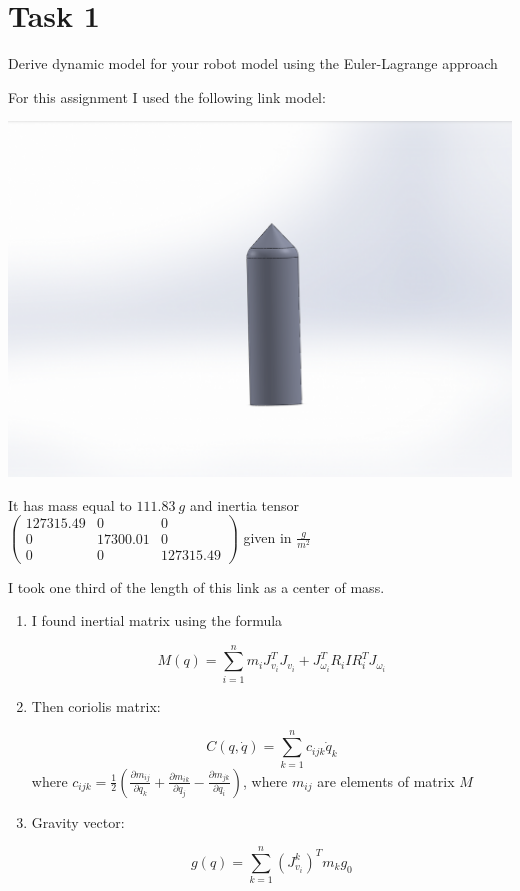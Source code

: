 \documentclass{article}
\begin{document}
    \section*{Task 1}

    Derive dynamic model for your robot model using the Euler-Lagrange approach

    For this assignment I used the following link model:

    \includegraphics[width=\linewidth]{part_image.png}

    It has mass equal to $111.83\ g$ and inertia tensor $\begin{pmatrix}
        127315.49 & 0 & 0 \\
        0 & 17300.01 & 0 \\
        0 & 0 & 127315.49
    \end{pmatrix}$ given in $\frac{g}{m^2}$

    I took one third of the length of this link as a center of mass. 

    \begin{enumerate}
        \item I found inertial matrix using the formula

            $$M(q) = \sum_{i=1}^{n} m_i J_{v_i}^{T} J_{v_i} + J_{\omega_i}^{T} R_i I R_{i}^{T} J_{\omega_i}$$

        \item Then coriolis matrix:
        
            $$C(q, \dot q) = \sum_{k=1}^{n} c_{ijk} \dot q_k$$
            where $c_{ijk} = \frac{1}{2} (\frac{\partial m_{ij}}{\partial q_k} + \frac{\partial m_{ik}}{\partial q_j} - \frac{\partial m_{jk}}{\partial q_i})$, where $m_{ij}$ are elements of matrix $M$

        \item Gravity vector:
        
            $$g(q) = \sum_{k=1}^{n} (J_{v_i}^k)^T m_k g_0$$
    \end{enumerate}
    
\end{document}
